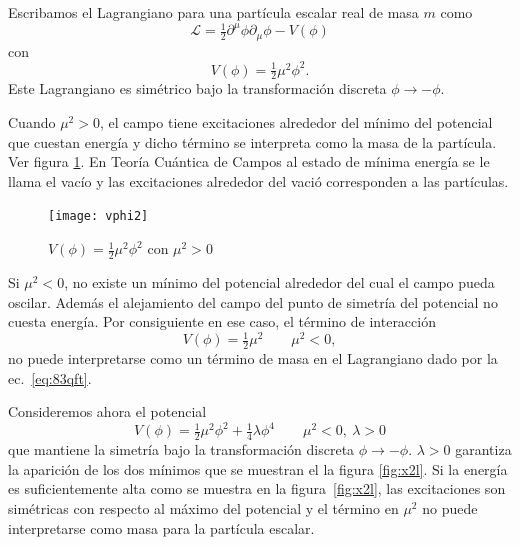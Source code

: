 \begin{frame}
Escribamos el Lagrangiano para una partícula escalar real de masa $m$ como
\begin{equation}
\label{eq:83qft}
\mathcal{L}=\tfrac{1}{2}\partial^\mu\phi\partial_\mu\phi-V(\phi)
\end{equation}
con
\begin{equation}
  V(\phi)=\tfrac{1}{2}\mu^2\phi^2.
\end{equation}
Este Lagrangiano es simétrico bajo la transformación discreta $\phi\to-\phi$. 

Cuando $\mu^2\gt 0$, el campo tiene excitaciones alrededor del mínimo del potencial que cuestan energía y dicho término se interpreta como la masa de la partícula. Ver figura \ref{fig:x2}. En Teoría Cuántica de Campos al estado de mínima energía se le llama el vacío y las excitaciones alrededor del vació corresponden a las partículas.
\begin{figure} %
  \centering %
  \texttt{[image: vphi2]}
  \caption{$V(\phi)=\frac{1}{2}\mu^2 \phi^2$ con $\mu^2\gt 0$} %
  \label{fig:x2} %
\end{figure} %

Si $\mu^2\lt 0$, no existe un mínimo del potencial alrededor del cual el campo pueda oscilar. Además el alejamiento del campo del punto de simetría del potencial no cuesta energía. Por consiguiente en ese caso, el término de interacción
\begin{equation}
  V(\phi)=\tfrac{1}{2}\mu^2   \qquad 
  \mu^2\lt 0,
\end{equation}
no puede interpretarse como un término de masa en el Lagrangiano dado por la ec.~\eqref{eq:83qft}. 

Consideremos ahora el potencial
\begin{equation}
  V(\phi)=\tfrac{1}{2}\mu^2\phi^2+\tfrac{1}{4}\lambda\phi^4
  \qquad   \mu^2\lt 0,\ \lambda\gt 0
\end{equation}
que mantiene la simetría bajo la transformación discreta $\phi\to-\phi$. $\lambda\gt 0$ garantiza la aparición de los dos mínimos que se muestran el la figura \ref{fig:x2l}. Si la energía es suficientemente alta como se muestra en la figura~\ref{fig:x2l}, las excitaciones son simétricas con respecto al máximo del potencial y el término en $\mu^2$ no puede interpretarse como masa para la partícula escalar. 


\end{frame}
